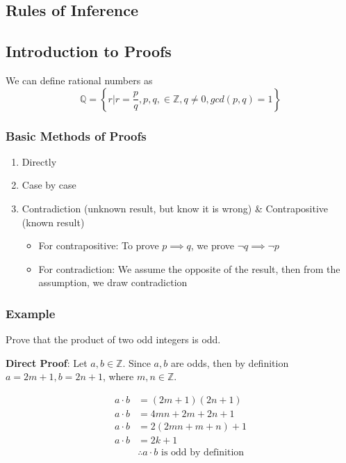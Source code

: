 \documentclass{article}
\begin{document}
\subsection{Rules of Inference}

\subsection{Introduction to Proofs}

We can define rational numbers as
\begin{equation}
	\mathbb{Q} = \left\{ r | r = \frac{ p }{ q }, p, q, \in \mathbb{Z}, q \neq 0, gcd(p, q) = 1 \right\}
\end{equation}

\subsubsection{Basic Methods of Proofs}

\begin{enumerate}
	\item Directly
	\item Case by case
	\item Contradiction (unknown result, but know it is wrong) \& Contrapositive (known result)
		\begin{itemize}
			\item For contrapositive: To prove $ p \implies q $, we prove $ \neg q \implies \neg p $
			\item For contradiction: We assume the opposite of the result, then from the assumption, we draw contradiction
		\end{itemize}
\end{enumerate}

\subsubsection{Example}

Prove that the product of two odd integers is odd.

\textbf{Direct Proof}: Let $ a, b \in \mathbb{Z} $. Since $ a, b $ are odds, then by definition $ a = 2m + 1, b = 2n + 1 $, where $ m, n \in \mathbb{Z} $.

\begin{align*}
	a \cdot b & = (2m + 1)(2n + 1) \\
	a \cdot b & = 4mn + 2m + 2n + 1 \\
	a \cdot b & = 2(2mn + m + n) + 1 \\
	a \cdot b & = 2k + 1 \\
			  & \therefore a \cdot b \text{ is odd by definition}
\end{align*}
\end{document}
